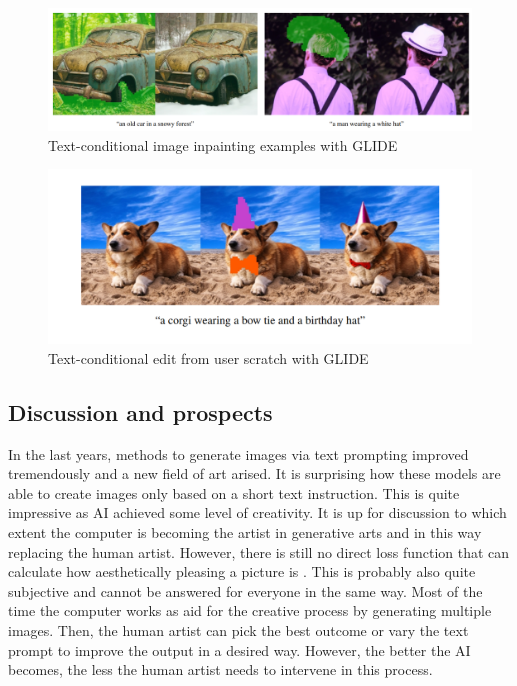 \documentclass[
]{krantz}
\begin{document}
\begin{figure}

{\centering \includegraphics[width=0.9\linewidth]{./figures/03-chapter3/Impainting_GLIDE} 

}

\caption{Text-conditional image inpainting examples with GLIDE \citep{GLIDE}}\label{fig:inpainting}
\end{figure}



\begin{figure}

{\centering \includegraphics[width=0.9\linewidth]{./figures/03-chapter3/GLIDE_sketch} 

}

\caption{Text-conditional edit from user scratch with GLIDE \citep{GLIDE}}\label{fig:sketch}
\end{figure}



\hypertarget{discussion-and-prospects}{%
\subsection{Discussion and prospects}\label{discussion-and-prospects}}

In the last years, methods to generate images via text prompting improved tremendously and a new field of art arised. It is surprising how these models are able to create images only based on a short text instruction. This is quite impressive as AI achieved some level of creativity. It is up for discussion to which extent the computer is becoming the artist in generative arts and in this way replacing the human artist. However, there is still no direct loss function that can calculate how aesthetically pleasing a picture is \citep{bias}. This is probably also quite subjective and cannot be answered for everyone in the same way. Most of the time the computer works as aid for the creative process by generating multiple images. Then, the human artist can pick the best outcome or vary the text prompt to improve the output in a desired way. However, the better the AI becomes, the less the human artist needs to intervene in this process.
\end{document}
